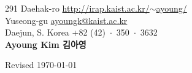 \documentclass{cv} %
\begin{document}
291 Daehak-ro \hfill \href{http://irap.kaist.ac.kr/$\sim$ayoung/}{http://irap.kaist.ac.kr/$\sim$ayoung/}\\
Yuseong-gu \hfill \href{mailto:ayoungk@kaist.ac.kr}{ayoungk@kaist.ac.kr}\\
Daejun, S. Korea \hfill +82 (42)~$\cdot$~350~$\cdot$~3632\\

\hfil{\namesize\bf Ayoung Kim 김아영}\hfil

%






%



%
%



\vspace{0.5in}
\hfill Revised \today
\end{document}

